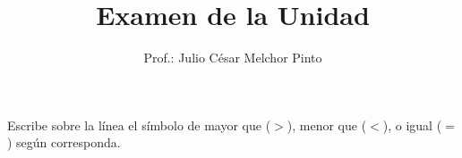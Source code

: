 \documentclass[12pt,addpoints]{evalua}
\title{Examen de la Unidad}
\author{Prof.: Julio César Melchor Pinto}
\begin{document}
\begin{questions}
      \question[10] Escribe sobre la línea el símbolo de mayor que ($>$), menor que ($<$), o igual ($=$) según corresponda.
      \begin{multicols}{2}
\end{multicols}
\end{questions}
\end{document}
